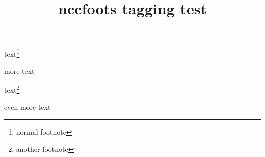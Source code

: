 \documentclass{article}
\title{nccfoots tagging test}
\begin{document}
text\footnote{normal footnote}

more text

text\footnote{another footnote}

even more text\Footnotemark{\textasteriskcentered}
\end{document}
